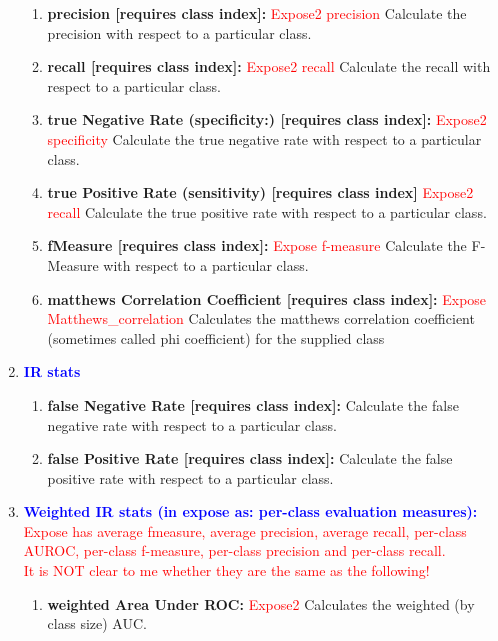 \documentclass[a4paper,12pt, english]{article}
\begin{document}
\begin{enumerate}
\begin{enumerate}
\item \textbf{precision [requires class index]: } \textcolor{red}{Expose2 precision}
          Calculate the precision with respect to a particular class.      
          
\item \textbf{recall [requires class index]: } \textcolor{red}{Expose2 recall}
          Calculate the recall with respect to a particular class. 
          
\item \textbf{true Negative Rate (specificity:)   [requires class index]: } \textcolor{red}{Expose2 specificity} 
          Calculate the true negative rate with respect to a particular class.
          
\item \textbf{true Positive Rate (sensitivity) [requires class index]  } \textcolor{red}{Expose2 recall} 
          Calculate the true positive rate with respect to a particular class.

\item \textbf{fMeasure [requires class index]: } \textcolor{red}{Expose f-measure}
          Calculate the F-Measure with respect to a particular class.    
          
\item \textbf{matthews Correlation Coefficient [requires class index]: } \textcolor{red}{Expose Matthews\_correlation}
          Calculates the matthews correlation coefficient (sometimes called phi coefficient) for the supplied class                
\end{enumerate}     



\item  \textbf{\textcolor{blue}{IR stats}} %
\begin{enumerate}          

          
\item \textbf{false Negative Rate [requires class index]: }
          Calculate the false negative rate with respect to a particular class. 
          
\item \textbf{false Positive Rate [requires class index]: }
          Calculate the false positive rate with respect to a particular class.           

\end{enumerate}     

\item \textbf{\textcolor{blue}{Weighted IR stats (in expose as: per-class evaluation measures): }}\\
\textcolor{red}{Expose has average fmeasure, average precision, average recall, per-class AUROC, per-class f-measure, per-class precision and per-class recall.\\
It is NOT clear to me whether they are the same as the following! }
\begin{enumerate}
\item \textbf{weighted Area Under ROC: } \textcolor{red}{Expose2}
          Calculates the weighted (by class size) AUC. 


\end{enumerate}
\end{enumerate}
\end{document}
